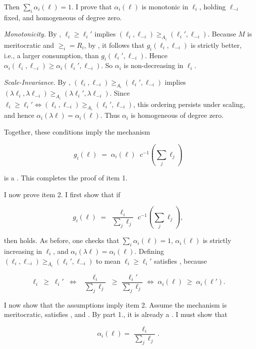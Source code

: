 \begin{propproof}
	Then 	\( \sum_i \alpha_i(\ell)=1\). I prove that \(\alpha_i(\ell)\) is monotonic in \(\ell_i\), holding \(\ell_{-i}\) fixed, and homogeneous of degree zero.

	\emph{Monotonicity.}
	By , \(\ell_i\ge\ell_i'\) implies \((\ell_i,\ell_{-i}) \ge_{A_i} (\ell_i',\ell_{-i})\). Because \(M\) is meritocratic and \(\ge_i=R_i\), by , it follows that \(g_i(\ell_i,\ell_{-i})\) is strictly better, i.e., a larger consumption, than \(g_i(\ell_i',\ell_{-i})\). Hence
	\(\alpha_i(\ell_i,\ell_{-i}) \ge \alpha_i(\ell_i',\ell_{-i})\). So \(\alpha_i\) is non-decreasing in \(\ell_i\).

	\emph{Scale-Invariance.}
	By , \((\ell_i,\ell_{-i}) \ge_{A_i} (\ell_i',\ell_{-i})\) implies \((\lambda\ell_i,\lambda\ell_{-i}) \ge_{A_i} (\lambda\ell_i',\lambda\ell_{-i})\). Since \(\ell_i\ge\ell_i'\iff(\ell_i,\ell_{-i})\ge_{A_i}(\ell_i',\ell_{-i})\), this ordering persists under scaling, and hence \(\alpha_i(\lambda\ell)=\alpha_i(\ell)\). Thus \(\alpha_i\) is homogeneous of degree zero.

	Together, these conditions imply the mechanism

	\[
		g_i(\ell)
		\;=\;
		\alpha_i(\ell)\;\;c^{-1} \left(\sum_j \ell_j \right)
	\]

	is a . This completes the proof of item 1.

	I now prove item 2. I first show that if

	\[
		g_i(\ell)
		\;=\;
		\frac{\ell_i}{\sum_j \ell_j}\;c^{-1} \left(\sum_j \ell_j \right),
	\]

	then  holds. As before, one checks that \(\sum_i \alpha_i(\ell)=1\), \(\alpha_i(\ell)\) is strictly increasing in \(\ell_i\), and \(\alpha_i(\lambda\ell)=\alpha_i(\ell)\). Defining \((\ell_i,\ell_{-i}) \ge_{A_i} (\ell_i',\ell_{-i})\) to mean \(\ell_i\ge \ell_i'\) satisfies , because

	\[
		\ell_i\;\ge\;\ell_i'
		\;\;\Longleftrightarrow\;\;
		\frac{\ell_i}{\sum_j\ell_j}
		\;\ge\;\frac{\ell_i'}{\sum_j\ell_j}
		\;\Longleftrightarrow\;\alpha_i(\ell)\;\ge\;\alpha_i(\ell').
	\]

	I now show that the assumptions imply item 2. Assume the mechanism is meritocratic, satisfies ,  and . By part 1., it is already a . I must show that

	\[ \alpha_i(\ell)=\frac{\ell_i}{\sum_j \ell_j} . \]


\end{propproof}

